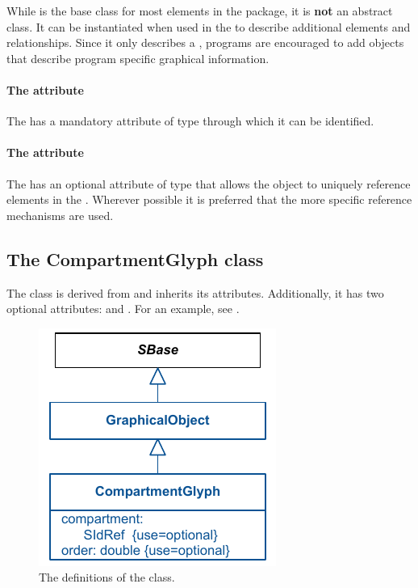 While \GraphicalObject is the base class for most elements in the \Layout 
package, it is \textbf{not} an abstract class. It can be instantiated when used 
in the  to describe additional 
elements and relationships. Since it only describes a \BoundingBox, programs 
are encouraged to add \Annotation objects that describe program 
specific graphical information. 

\paragraph{The  attribute}
The \GraphicalObject has a mandatory  attribute of type 
 through which it can be identified. 


\paragraph{The  attribute}
The \GraphicalObject has an optional  attribute of type 
 that allows the object to uniquely reference elements 
in the \Model. Wherever possible it is preferred that the more specific 
reference mechanisms are used. 


\subsection{The CompartmentGlyph class }
\label{compartmentglyph-class}
The \CompartmentGlyph class is derived from \GraphicalObject and 
inherits its attributes. Additionally, it has two optional attributes:
 and . For an example, see 
. 

\begin{figure}[!ht]
\includegraphics{uml/layout-compartmentglyph-uml}
\caption{The definitions of the \CompartmentGlyph class.}
\label{uml:compartmentglyph}
\end{figure}



